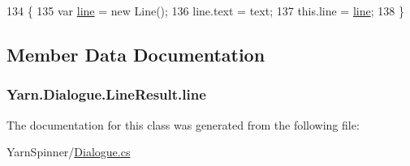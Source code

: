 \begin{DoxyCode}
134                                             \{
135                 var \hyperlink{a00104_abfbb0ea840b02acd0ecdc72c5b120257}{line} = \textcolor{keyword}{new} Line();
136                 line.text = text;
137                 this.line = \hyperlink{a00104_abfbb0ea840b02acd0ecdc72c5b120257}{line};
138             \}
\end{DoxyCode}


\subsection{Member Data Documentation}
\hypertarget{a00104_abfbb0ea840b02acd0ecdc72c5b120257}{
\subsubsection[{line}]{ Yarn.\-Dialogue.\-Line\-Result.\-line}}\label{a00104_abfbb0ea840b02acd0ecdc72c5b120257}


The documentation for this class was generated from the following file\-:\begin{DoxyCompactItemize}
\item 
Yarn\-Spinner/\hyperlink{a00262}{Dialogue.\-cs}\end{DoxyCompactItemize}
